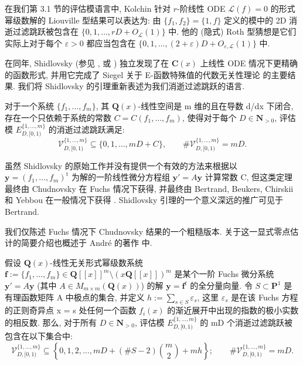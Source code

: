 在我们第 3.1 节的评估模语言中, Kolchin 针对 \(r\)-阶线性 ODE \(\mathcal{L}(f)=0\) 的形式幂级数解的 Liouville 型结果可以表达为: 
由 \(\{f_1, f_2\} = \{1, f\}\) 定义的模中的 2D 消逝过滤跳跃被包含在 \(\{0, 1, \ldots, rD + O_{\mathcal{L}}(1)\}\) 中. 
他的 (隐式) Roth 型猜想是它们实际上对于每个 \(\varepsilon > 0\) 都应当包含在 \(\{0, 1, \ldots, (2 + \varepsilon)D + O_{\varepsilon, \mathcal{L}}(1)\}\) 中.

在同年, Shidlovsky \cite{Shi59} (参见 \cite[§ 3.5, Lemma 8]{Shi89}, 或 \cite[§ VII.3]{Lan66}) 
独立发现了在 \(\mathbf{C}(x)\) 上线性 ODE 情况下更精确的函数形式, 
并用它完成了 Siegel 关于 E-函数特殊值的代数无关性理论 \cite{Sie49} 的主要结果. 
我们将 Shidlovsky 的引理重新表述为我们消逝过滤跳跃的语言.

\begin{theorem}[Shidlovsky]\label{thm:3.2.8}
对于一个系统 \(\{f_1, \ldots, f_m\}\), 其 \(\mathbf{Q}(x)\)-线性空间是 m 维的且在导数 d/dx 下闭合, 
存在一个只依赖于系统的常数 \(C = C(f_1, \ldots, f_m)\), 
使得对于每个 \(D \in \mathbf{N}_{>0}\), 评估模 \(E_{D,[0,1)}^{\{1,\ldots,m\}}\) 的消逝过滤跳跃满足:
\begin{equation}\label{eq:3.2.9}
\mathcal{V}_{D,[0,1)}^{\{1,\dots,m\}} \subseteq \{0,1,\dots,mD+C\}, \qquad \#\mathcal{V}_{D,[0,1)}^{\{1,\dots,m\}} = mD.
\end{equation}
\end{theorem}

虽然 Shidlovsky 的原始工作并没有提供一个有效的方法来根据以 \(\mathbf{y} = (f_1, \dots, f_m)^{\mathrm{t}}\) 为解的一阶线性微分方程组 \(\mathbf{y}' = A\mathbf{y}\) 计算常数 C, 
但这类定理最终由 Chudnovsky \cite[Corollary 11.3.10]{Chu80} 在 Fuchs 情况下获得, 
并最终由 Bertrand, Beukers, Chirskii 和 Yebbou 在一般情况下获得 \cite{BB85}. 
Shidlovsky 引理的一个意义深远的推广可见于 Bertrand.

我们仅陈述 Fuchs 情况下 Chudnovsky 结果的一个粗糙版本. 
关于这一显式零点估计的简要介绍也概述于 Andr{\'e} 的著作 \cite[§ III, Appendix]{And04} 中.

\begin{theorem}[Chudnovsky]\label{thm:3.2.10}
假设 \(\mathbf{Q}(x)\)-线性无关形式幂级数系统 \(\mathbf{f} := \{f_1, \dots, f_m\} \in \mathbf{Q}[\![x]\!]^m \setminus (x\mathbf{Q}[\![x]\!])^m\) 
是某个一阶 Fuchs 微分系统 \(\mathbf{y}' = A\mathbf{y}\) (其中 \(A \in M_{m \times m}(\mathbf{Q}(x))\)) 的解 \(\mathbf{y} = \mathbf{f}^t\) 的全分量向量. 
令 \(S \subset \mathbf{P}^1\) 是有理函数矩阵 A 中极点的集合, 并定义 \(h := \sum_{s \in S} \varepsilon_s\), 
这里 \(\varepsilon_s\) 是在该 Fuchs 方程的正则奇异点 x = s 处任何一个函数 \(f_i(x)\) 的渐近展开中出现的指数的极小实数的相反数.
那么, 对于所有 \(D \in \mathbf{N}_{>0}\), 评估模 \(E_{D,[0,1)}^{\{1,\ldots,m\}}\) 的 mD 个消逝过滤跳跃被包含在以下集合中:
\begin{equation}\label{eq:3.2.11}
\mathcal{V}_{D,[0,1)}^{\{1,\dots,m\}} \subseteq \left\{0,1,2,\dots,mD + (\#S-2)\binom{m}{2} + mh\right\}; \qquad \#\mathcal{V}_{D,[0,1)}^{\{1,\dots,m\}} = mD.
\end{equation}
\end{theorem}

